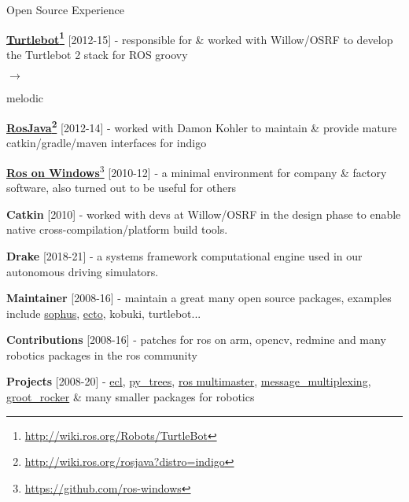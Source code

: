 \documentclass[a4paper,10pt]{article}
\begin{document}
\begin{cvsection}{Open Source Experience}
 \raggedright
  \begin{djs_itemize}
    \item \textbf{\href{http://wiki.ros.org/Robots/TurtleBot}{Turtlebot}\footnote{\href{http://wiki.ros.org/Robots/TurtleBot}{http://wiki.ros.org/Robots/TurtleBot}}} [2012-15] - responsible for \& worked with Willow/OSRF to develop the Turtlebot 2 stack for ROS groovy \begin{small}$\rightarrow$\end{small} melodic
    \item \textbf{\href{http://wiki.ros.org/rosjava?distro=indigo}{RosJava}\footnote{\href{http://wiki.ros.org/rosjava?distro=indigo}{http://wiki.ros.org/rosjava?distro=indigo}}} [2012-14] - worked with Damon Kohler to maintain \& provide mature catkin/gradle/maven interfaces for indigo
    \item \textbf{\href{https://github.com/ros-windows}{Ros on Windows}}\footnote{\href{https://github.com/ros-windows}{https://github.com/ros-windows}} [2010-12] - a minimal environment for company \& factory software, also turned out to be useful for others
    \item \textbf{Catkin} [2010] - worked with devs at Willow/OSRF in the design phase to enable native cross-compilation/platform build tools.
    \item \textbf{Drake} [2018-21] - a systems framework computational engine used in our autonomous driving simulators.
    \item \textbf{Maintainer} [2008-16] - maintain a great many open source packages, examples include \href{https://github.com/stonier/sophus}{sophus}, \href{https://github.com/plasmodic/ecto}{ecto}, kobuki, turtlebot...
    \item \textbf{Contributions} [2008-16] - patches for ros on arm, opencv, redmine and many robotics packages in the ros community
    \item \textbf{Projects} [2008-20] - \href{https://github.com/stonier/ecl_core}{ecl}, \href{https://github.com/stonier/py_trees_suite}{py\_trees}, \href{https://github.com/robotics-in-concert/rocon_multimaster}{ros multimaster}, \href{https://github.com/stonier/message_multiplexing}{message\_multiplexing}, \href{https://github.com/stonier/groot_rocker}{groot\_rocker} \& many smaller packages for robotics
  \end{djs_itemize}
\end{cvsection}
\end{document}
